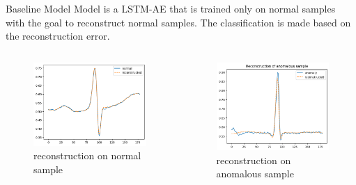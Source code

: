 \begin{frame}{Baseline Model}
    Model is a LSTM-AE that is trained only on normal samples with the goal to reconstruct normal samples. The classification is made based on the reconstruction error.
    \begin{columns}
        \begin{column}{0.48\textwidth}
        \begin{figure}
            \centering
            \includegraphics[scale=0.3]{images/rec_normal.png}
            \caption{reconstruction on normal sample \phantom{asdfsadf}}
            \label{fig:enter-label}
        \end{figure}
    \end{column}
    \begin{column}{0.48\textwidth}
        \begin{figure}
            \centering
            \includegraphics[scale=0.3]{images/rec_anom.png}
            \caption{reconstruction on anomalous sample}
            \label{fig:enter-label}
        \end{figure}
    \end{column}
    \end{columns}
\end{frame}

